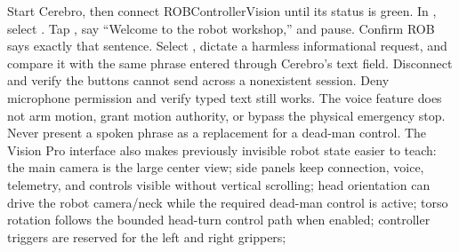 \markdownRendererInterblockSeparator
{}\markdownRendererOlBegin
{}Start Cerebro, then connect ROBControllerVision until its status is green.\markdownRendererOlItemEnd 
{}In , select .\markdownRendererOlItemEnd 
{}Tap , say “Welcome to the robot workshop,” and pause. Confirm ROB\markdownRendererSoftLineBreak
{}says exactly that sentence.\markdownRendererOlItemEnd 
{}Select , dictate a harmless informational request, and compare it\markdownRendererSoftLineBreak
{}with the same phrase entered through Cerebro's text field.\markdownRendererOlItemEnd 
{}Disconnect and verify the buttons cannot send across a nonexistent session.\markdownRendererOlItemEnd 
{}Deny microphone permission and verify typed text still works.\markdownRendererOlItemEnd 
\markdownRendererOlEnd \markdownRendererInterblockSeparator
{}The voice feature does not arm motion, grant motion authority, or bypass the\markdownRendererSoftLineBreak
{}physical emergency stop. Never present a spoken phrase as a replacement for a\markdownRendererSoftLineBreak
{}dead-man control.\markdownRendererInterblockSeparator
{}
\markdownRendererSectionEnd \markdownRendererSectionBegin
{}\markdownRendererInterblockSeparator
{}The Vision Pro interface also makes previously invisible robot state easier to\markdownRendererSoftLineBreak
{}teach:\markdownRendererInterblockSeparator
{}\markdownRendererUlBegin
\markdownRendererUlItem the main camera is the large center view;\markdownRendererUlItemEnd 
\markdownRendererUlItem side panels keep connection, voice, telemetry, and controls visible without\markdownRendererSoftLineBreak
{}vertical scrolling;\markdownRendererUlItemEnd 
\markdownRendererUlItem head orientation can drive the robot camera/neck while the required\markdownRendererSoftLineBreak
{}dead-man control is active;\markdownRendererUlItemEnd 
\markdownRendererUlItem torso rotation follows the bounded head-turn control path when enabled;\markdownRendererUlItemEnd 
\markdownRendererUlItem controller triggers are reserved for the left and right grippers;\markdownRendererUlItemEnd 
